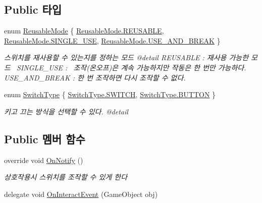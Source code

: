 \subsection*{Public 타입}
\begin{DoxyCompactItemize}
\item 
enum \mbox{\hyperlink{class_switch_ab6cd06c871c19ba8fbe1765515a828cc}{Reusable\+Mode}} \{ \mbox{\hyperlink{class_switch_ab6cd06c871c19ba8fbe1765515a828ccaa9dc406f543aa119dd64d44539c1d621}{Reusable\+Mode.\+R\+E\+U\+S\+A\+B\+LE}}, 
\mbox{\hyperlink{class_switch_ab6cd06c871c19ba8fbe1765515a828cca06b7b3df8f43bcb08921743661cf1e5e}{Reusable\+Mode.\+S\+I\+N\+G\+L\+E\+\_\+\+U\+SE}}, 
\mbox{\hyperlink{class_switch_ab6cd06c871c19ba8fbe1765515a828cca811a058adb2f2ff94e6a43f7df8cd027}{Reusable\+Mode.\+U\+S\+E\+\_\+\+A\+N\+D\+\_\+\+B\+R\+E\+AK}}
 \}
\begin{DoxyCompactList}\small\item\em 스위치를 재사용할 수 있는지를 정하는 모드 @detail R\+E\+U\+S\+A\+B\+LE \+: 재사용 가능한 모드~\newline
S\+I\+N\+G\+L\+E\+\_\+\+U\+SE \+:~\newline
조작(온오프)은 계속 가능하지만 작동은 한 번만 가능하다.~\newline
U\+S\+E\+\_\+\+A\+N\+D\+\_\+\+B\+R\+E\+AK \+: 한 번 조작하면 다시 조작할 수 없다. \end{DoxyCompactList}\item 
enum \mbox{\hyperlink{class_switch_aa3d83cf921138e9b74aa9a28f1970a3f}{Switch\+Type}} \{ \mbox{\hyperlink{class_switch_aa3d83cf921138e9b74aa9a28f1970a3fa4239f063a3d4fb9d38a0182be6e39e76}{Switch\+Type.\+S\+W\+I\+T\+CH}}, 
\mbox{\hyperlink{class_switch_aa3d83cf921138e9b74aa9a28f1970a3fa57b35198356d373bcd2a6e08abcb3795}{Switch\+Type.\+B\+U\+T\+T\+ON}}
 \}
\begin{DoxyCompactList}\small\item\em 키고 끄는 방식을 선택할 수 있다. @detail \end{DoxyCompactList}\end{DoxyCompactItemize}
\subsection*{Public 멤버 함수}
\begin{DoxyCompactItemize}
\item 
override void \mbox{\hyperlink{class_switch_a19366c58c24da5801977ecc108270c5a}{On\+Notify}} ()
\begin{DoxyCompactList}\small\item\em 상호작용시 스위치를 조작할 수 있게 한다 \end{DoxyCompactList}\item 
delegate void \mbox{\hyperlink{class_interactable_object_a70a579e4b09d53e6cb77b5222189d5eb}{On\+Interact\+Event}} (Game\+Object obj)
\end{DoxyCompactItemize}
